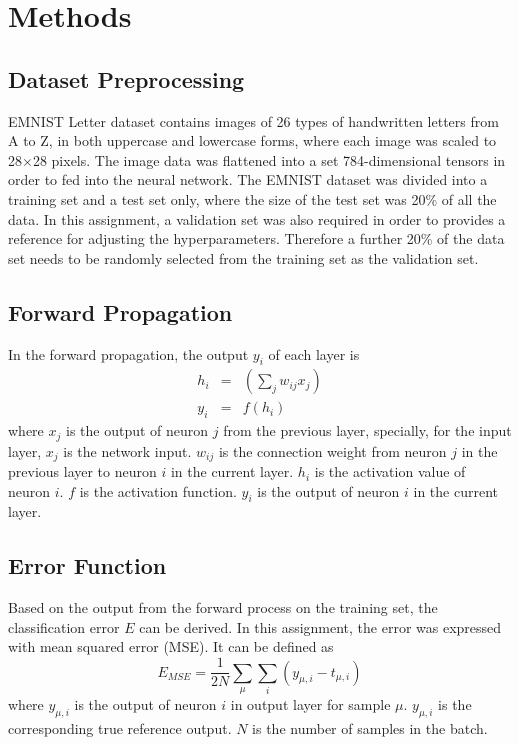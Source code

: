 \documentclass[conference]{IEEEtran}
\begin{document}
\section{Methods}

\subsection{Dataset Preprocessing}

EMNIST Letter dataset contains images of 26 types of handwritten letters from A to Z, in both uppercase and lowercase forms, where each image was scaled to 28\({\times}\)28 pixels. The image data was flattened into a set 784-dimensional tensors in order to fed into the neural network. The EMNIST dataset was divided into a training set and a test set only, where the size of the test set was 20\% of all the data. In this assignment, a validation set was also required in order to provides a reference for adjusting the hyperparameters. Therefore a further 20\% of the data set needs to be randomly selected from the training set as the validation set.

\subsection{Forward Propagation}

In the forward propagation, the output \(y_i\) of each layer is
\begin{eqnarray}
    h_i &=& \left(\sum_j{w_{ij}x_j}\right)\\
    y_i &=& f(h_i)
\end{eqnarray}
where \(x_j\) is the output of neuron \(j\) from the previous layer, specially, for the input layer, \(x_j\) is the network input. \(w_{ij}\) is the connection weight from neuron \(j\) in the previous layer to neuron \(i\) in the current layer. \(h_i\) is the activation value of neuron \(i\). \(f\) is the activation function. \(y_i\) is the output of neuron \(i\) in the current layer.

\subsection{Error Function}

Based on the output from the forward process on the training set, the classification error \(E\) can be derived. In this assignment, the error was expressed with mean squared error (MSE). It can be defined as
\begin{equation}
    E_{MSE}=\frac{1}{2N}\sum_\mu\sum_i\left(y_{\mu,i}-t_{\mu,i}\right)
\end{equation}
where \(y_{\mu,i}\) is the output of neuron \(i\) in output layer for sample \({\mu}\). \(y_{\mu,i}\) is the corresponding true reference output. \(N\) is the number of samples in the batch.
\end{document}
